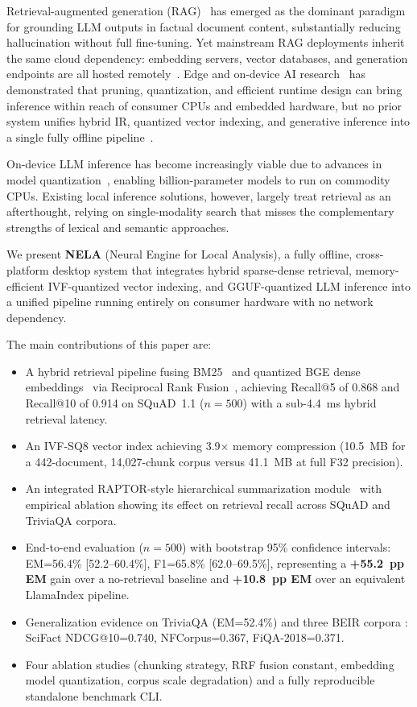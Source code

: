 \documentclass[conference]{IEEEtran}
\begin{document}
Retrieval-augmented generation (RAG)~\cite{b2} has emerged as the dominant
paradigm for grounding LLM outputs in factual document content, substantially
reducing hallucination without full fine-tuning. Yet mainstream RAG
deployments inherit the same cloud dependency: embedding servers, vector
databases, and generation endpoints are all hosted remotely~\cite{b11,b12}.
Edge and on-device AI research~\cite{b13,b14} has demonstrated that
pruning, quantization, and efficient runtime design can bring inference within
reach of consumer CPUs and embedded hardware, but no prior system unifies
hybrid IR, quantized vector indexing, and generative inference into a single
fully offline pipeline~\cite{b15,b16}.

On-device LLM inference has become increasingly viable due to advances in
model quantization~\cite{b8,b9}, enabling billion-parameter models to run
on commodity CPUs. Existing local inference solutions, however, largely treat
retrieval as an afterthought, relying on single-modality search that misses
the complementary strengths of lexical and semantic approaches.

We present \textbf{NELA} (Neural Engine for Local Analysis), a fully offline,
cross-platform desktop system that integrates hybrid sparse-dense retrieval,
memory-efficient IVF-quantized vector indexing, and GGUF-quantized LLM
inference into a unified pipeline running entirely on consumer hardware with
no network dependency.

The main contributions of this paper are:
\begin{itemize}
  \item A hybrid retrieval pipeline fusing BM25~\cite{b3} and quantized BGE
        dense embeddings~\cite{b4} via Reciprocal Rank Fusion~\cite{b5},
        achieving Recall@5 of 0.868 and Recall@10 of 0.914 on SQuAD~1.1
        ($n{=}500$) with a sub-4.4~ms hybrid retrieval latency.
  \item An IVF-SQ8 vector index achieving 3.9$\times$ memory compression
        (10.5~MB for a 442-document, 14{,}027-chunk corpus versus 41.1~MB at
        full F32 precision).
  \item An integrated RAPTOR-style hierarchical summarization module~\cite{b6}
        with empirical ablation showing its effect on retrieval recall across
        SQuAD and TriviaQA corpora.
  \item End-to-end evaluation ($n{=}500$) with bootstrap 95\% confidence
        intervals: EM=56.4\% [52.2--60.4\%], F1=65.8\% [62.0--69.5\%],
        representing a \textbf{+55.2~pp EM} gain over a no-retrieval baseline
        and \textbf{+10.8~pp EM} over an equivalent LlamaIndex pipeline.
  \item Generalization evidence on TriviaQA (EM=52.4\%) and three BEIR corpora
        \cite{b23}: SciFact NDCG@10=0.740, NFCorpus=0.367, FiQA-2018=0.371.
  \item Four ablation studies (chunking strategy, RRF fusion constant,
        embedding model quantization, corpus scale degradation) and a fully
        reproducible standalone benchmark CLI.
\end{itemize}
\end{document}
